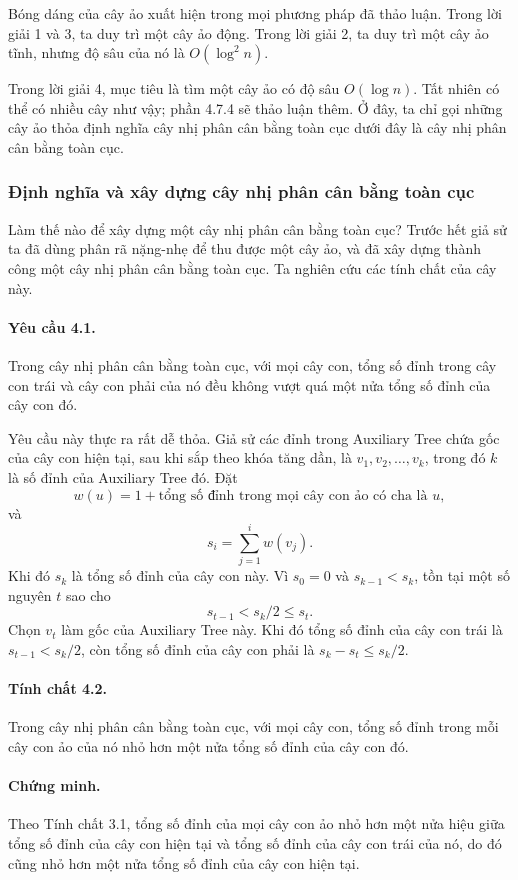 \documentclass[11pt]{article}
\begin{document}
Bóng dáng của cây ảo xuất hiện trong mọi phương pháp đã thảo luận. Trong lời
giải 1 và 3, ta duy trì một cây ảo động. Trong lời giải 2, ta duy trì một cây
ảo tĩnh, nhưng độ sâu của nó là $O(\log^2 n)$.

Trong lời giải 4, mục tiêu là tìm một cây ảo có độ sâu $O(\log n)$. Tất nhiên
có thể có nhiều cây như vậy; phần 4.7.4 sẽ thảo luận thêm. Ở đây, ta chỉ gọi
những cây ảo thỏa định nghĩa cây nhị phân cân bằng toàn cục dưới đây là cây
nhị phân cân bằng toàn cục.

\subsubsection{Định nghĩa và xây dựng cây nhị phân cân bằng toàn cục}

Làm thế nào để xây dựng một cây nhị phân cân bằng toàn cục? Trước hết giả sử
ta đã dùng phân rã nặng-nhẹ để thu được một cây ảo, và đã xây dựng thành công
một cây nhị phân cân bằng toàn cục. Ta nghiên cứu các tính chất của cây này.

\paragraph{Yêu cầu 4.1.}
Trong cây nhị phân cân bằng toàn cục, với mọi cây con, tổng số đỉnh trong cây
con trái và cây con phải của nó đều không vượt quá một nửa tổng số đỉnh của
cây con đó.

Yêu cầu này thực ra rất dễ thỏa. Giả sử các đỉnh trong Auxiliary Tree chứa gốc
của cây con hiện tại, sau khi sắp theo khóa tăng dần, là
$v_1,v_2,\ldots,v_k$, trong đó $k$ là số đỉnh của Auxiliary Tree đó. Đặt
\[
  w(u)=1+\text{tổng số đỉnh trong mọi cây con ảo có cha là }u,
\]
và
\[
  s_i=\sum_{j=1}^{i} w(v_j).
\]
Khi đó $s_k$ là tổng số đỉnh của cây con này. Vì $s_0=0$ và $s_{k-1}<s_k$, tồn
tại một số nguyên $t$ sao cho
\[
  s_{t-1} < s_k/2 \le s_t.
\]
Chọn $v_t$ làm gốc của Auxiliary Tree này. Khi đó tổng số đỉnh của cây con
trái là $s_{t-1}<s_k/2$, còn tổng số đỉnh của cây con phải là
$s_k-s_t\le s_k/2$.

\paragraph{Tính chất 4.2.}
Trong cây nhị phân cân bằng toàn cục, với mọi cây con, tổng số đỉnh trong mỗi
cây con ảo của nó nhỏ hơn một nửa tổng số đỉnh của cây con đó.

\paragraph{Chứng minh.}
Theo Tính chất 3.1, tổng số đỉnh của mọi cây con ảo nhỏ hơn một nửa hiệu giữa
tổng số đỉnh của cây con hiện tại và tổng số đỉnh của cây con trái của nó, do
đó cũng nhỏ hơn một nửa tổng số đỉnh của cây con hiện tại.
\end{document}
